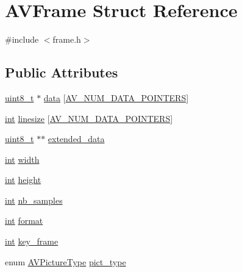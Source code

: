 \hypertarget{struct_a_v_frame}{}\section{A\+V\+Frame Struct Reference}
\label{struct_a_v_frame}


{\ttfamily \#include $<$frame.\+h$>$}

\subsection*{Public Attributes}
\begin{DoxyCompactItemize}
\item 
\hyperlink{lib-src_2ffmpeg_2win32_2stdint_8h_a9a941819355e6f658991890ff66b4b0e}{uint8\+\_\+t} $\ast$ \hyperlink{struct_a_v_frame_a1d0f65014a8d1bf78cec8cbed2304992}{data} \mbox{[}\hyperlink{ffmpeg_2libavutil_2frame_8h_add80189702cf0f5ea82718576fb43201}{A\+V\+\_\+\+N\+U\+M\+\_\+\+D\+A\+T\+A\+\_\+\+P\+O\+I\+N\+T\+E\+RS}\mbox{]}
\item 
\hyperlink{xmltok_8h_a5a0d4a5641ce434f1d23533f2b2e6653}{int} \hyperlink{struct_a_v_frame_aa52bfc6605f6a3059a0c3226cc0f6567}{linesize} \mbox{[}\hyperlink{ffmpeg_2libavutil_2frame_8h_add80189702cf0f5ea82718576fb43201}{A\+V\+\_\+\+N\+U\+M\+\_\+\+D\+A\+T\+A\+\_\+\+P\+O\+I\+N\+T\+E\+RS}\mbox{]}
\item 
\hyperlink{lib-src_2ffmpeg_2win32_2stdint_8h_a9a941819355e6f658991890ff66b4b0e}{uint8\+\_\+t} $\ast$$\ast$ \hyperlink{struct_a_v_frame_afca04d808393822625e09b5ba91c6756}{extended\+\_\+data}
\item 
\hyperlink{xmltok_8h_a5a0d4a5641ce434f1d23533f2b2e6653}{int} \hyperlink{struct_a_v_frame_a1e71ce60cedd5f3b6811714a9f7f9e0a}{width}
\item 
\hyperlink{xmltok_8h_a5a0d4a5641ce434f1d23533f2b2e6653}{int} \hyperlink{struct_a_v_frame_a3f89733f429c98ba5bc64373fb0a3f13}{height}
\item 
\hyperlink{xmltok_8h_a5a0d4a5641ce434f1d23533f2b2e6653}{int} \hyperlink{struct_a_v_frame_a02f45ab8191aea1660159f1e464237ea}{nb\+\_\+samples}
\item 
\hyperlink{xmltok_8h_a5a0d4a5641ce434f1d23533f2b2e6653}{int} \hyperlink{struct_a_v_frame_aed14fa772ce46881020fd1545c86432c}{format}
\item 
\hyperlink{xmltok_8h_a5a0d4a5641ce434f1d23533f2b2e6653}{int} \hyperlink{struct_a_v_frame_a3649a81e8414a193d685a6eee06ce902}{key\+\_\+frame}
\item 
enum \hyperlink{group__lavu__picture_gae6cbcab1f70d8e476757f1c1f5a0a78e}{A\+V\+Picture\+Type} \hyperlink{struct_a_v_frame_af9920fc3fbfa347b8943ae461b50d18b}{pict\+\_\+type}
$$
\end{DoxyCompactItemize}
